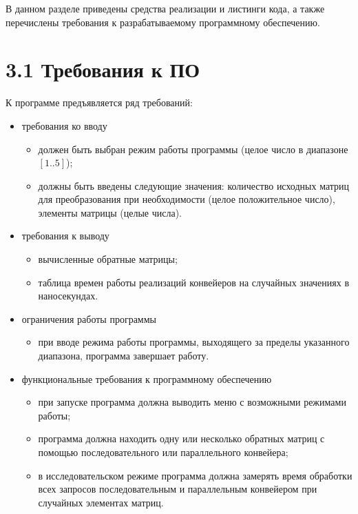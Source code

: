 \documentclass[12pt, a4paper]{report}
\begin{document}
	В данном разделе приведены средства реализации и листинги кода, а также перечислены требования к разрабатываемому программному обеспечению.
	
	\section*{3.1 Требования к ПО}
	
	К программе предъявляется ряд требований:
	
	\begin{itemize}
		\item требования ко вводу
		\begin{itemize}
			\item должен быть выбран режим работы программы (целое число в диапазоне $[1..5]$);
			\item должны быть введены следующие значения: количество исходных матриц для преобразования при необходимости (целое положительное число), элементы матрицы (целые числа).
		\end{itemize}
		\item требования к выводу
		\begin{itemize}
			\item вычисленные обратные матрицы;
			\item таблица времен работы реализаций конвейеров на случайных значениях в наносекундах.
		\end{itemize}
		\item ограничения работы программы
		\begin{itemize}
			\item при вводе режима работы программы, выходящего за пределы указанного диапазона, программа завершает работу.
		\end{itemize}
		\item функциональные требования к программному обеспечению
		\begin{itemize}
			\item при запуске программа должна выводить меню с возможными режимами работы;
			\item программа должна находить одну или несколько обратных матриц с помощью последовательного или параллельного конвейера;
			\item в исследовательском режиме программа должна замерять время обработки всех запросов последовательным и параллельным конвейером при случайных элементах матриц.
		\end{itemize}
	\end{itemize}
	
\end{document}
